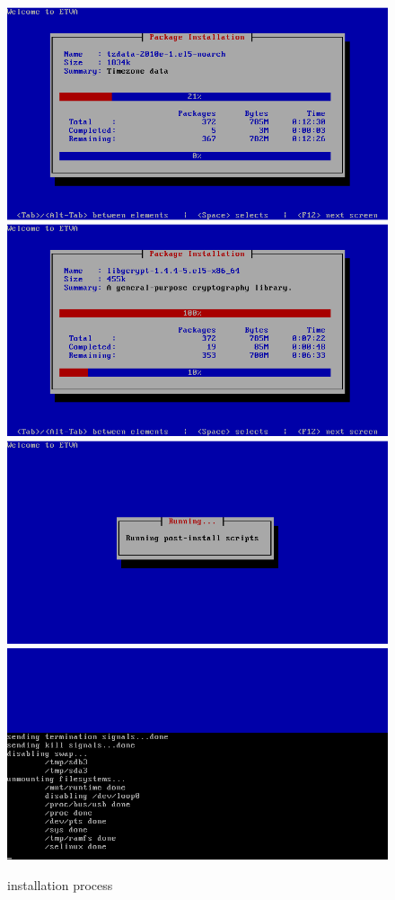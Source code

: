 \begin{figure}[H]
\begin{center}
    \includegraphics[scale=0.4]{screenshots/install_etva6.png}        
    \includegraphics[scale=0.4]{screenshots/install_etva8.png}
    \includegraphics[scale=0.4]{screenshots/install_etva9.png}
    \includegraphics[scale=0.4]{screenshots/install_etva10.png}
\caption{\acronym installation process}
	\label{fig:installation_standard}
	\end{center}
\end{figure}

